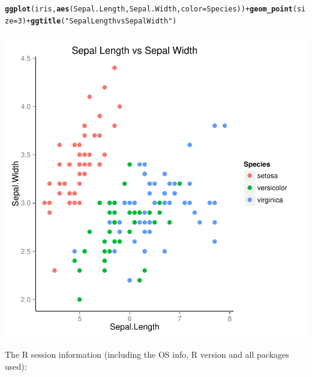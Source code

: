 \documentclass{article}\usepackage[]{graphicx}\usepackage[]{color}
\makeatletter
\newcommand{\hlnum}[1]{\textcolor[rgb]{0.686,0.059,0.569}{#1}}%
\newcommand{\hlstr}[1]{\textcolor[rgb]{0.192,0.494,0.8}{#1}}%
\newcommand{\hlopt}[1]{\textcolor[rgb]{0,0,0}{#1}}%
\newcommand{\hlstd}[1]{\textcolor[rgb]{0.345,0.345,0.345}{#1}}%
\newcommand{\hlkwc}[1]{\textcolor[rgb]{0.333,0.667,0.333}{#1}}%
\newcommand{\hlkwd}[1]{\textcolor[rgb]{0.737,0.353,0.396}{\textbf{#1}}}%
\newenvironment{kframe}{%
 \def\at@end@of@kframe{}%
 \ifinner\ifhmode%
  \def\at@end@of@kframe{\end{minipage}}%
  \begin{minipage}{\columnwidth}%
 \fi\fi%
 \def\FrameCommand##1{\hskip\@totalleftmargin \hskip-\fboxsep
 \colorbox{shadecolor}{##1}\hskip-\fboxsep
     \hskip-\linewidth \hskip-\@totalleftmargin \hskip\columnwidth}%
 \MakeFramed {\advance\hsize-\width
   \@totalleftmargin\z@ \linewidth\hsize
   \@setminipage}}%
 {\par\unskip\endMakeFramed%
 \at@end@of@kframe}
\newenvironment{knitrout}{}{} %
\makeatother
\begin{document}
\begin{knitrout}
\color{fgcolor}\begin{kframe}
\begin{alltt}
\hlkwd{ggplot}\hlstd{(iris,} \hlkwd{aes}\hlstd{(Sepal.Length, Sepal.Width,} \hlkwc{color} \hlstd{= Species))} \hlopt{+} \hlkwd{geom_point}\hlstd{(}\hlkwc{size} \hlstd{=} \hlnum{3}\hlstd{)} \hlopt{+} \hlkwd{ggtitle}\hlstd{(}\hlstr{"Sepal Length vs Sepal Width"}\hlstd{)}
\end{alltt}
\end{kframe}

{\centering \includegraphics[width=.6\linewidth]{figure/script-Rnwfirst_figure} 

}



\end{knitrout}


The R session information (including the OS info, R version and all
packages used):
\end{document}
